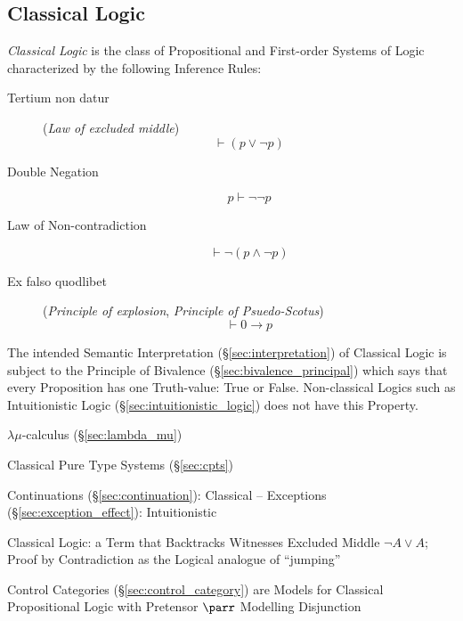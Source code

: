 \subsection{Classical Logic}\label{sec:classical_logic}

\emph{Classical Logic} is the class of Propositional and
First-order Systems of Logic characterized by the following Inference
Rules:

\begin{description}

\item [Tertium non datur] (\emph{Law of excluded middle})
  \[
    \vdash(p \vee \neg p)
  \]

\item [Double Negation]
  \[
    p \vdash \neg\neg p
  \]

\item [Law of Non-contradiction]
  \[
    \vdash \neg(p \wedge \neg p)
  \]

\item [Ex falso quodlibet] (\emph{Principle of explosion},
  \emph{Principle of Psuedo-Scotus})
  \[
    \vdash 0 \rightarrow p
  \]


\end{description}

The intended Semantic Interpretation (\S\ref{sec:interpretation}) of
Classical Logic is subject to the Principle of Bivalence
(\S\ref{sec:bivalence_principal}) which says that every Proposition
has one Truth-value: True or False. Non-classical Logics such as
Intuitionistic Logic (\S\ref{sec:intuitionistic_logic}) does not have
this Property.

\fist $\lambda\mu$-calculus (\S\ref{sec:lambda_mu})

\fist Classical Pure Type Systems (\S\ref{sec:cpts})


Continuations (\S\ref{sec:continuation}): Classical -- Exceptions
(\S\ref{sec:exception_effect}): Intuitionistic

Classical Logic: a Term that Backtracks Witnesses Excluded Middle
$\neg A \vee A$; Proof by Contradiction as the Logical analogue of
``jumping''

Control Categories (\S\ref{sec:control_category}) are Models for
Classical Propositional Logic with Pretensor $\parr$ Modelling
Disjunction




